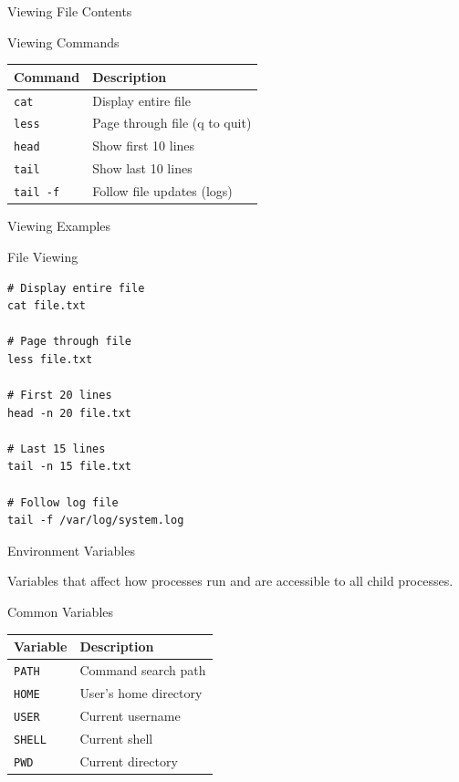 \documentclass[presentation,aspectratio=1610]{beamer}
\begin{document}
\begin{frame}[label={sec:org0a8ea09},fragile]{Viewing File Contents}
 \begin{block}{Viewing Commands}
\begin{center}
\begin{tabular}{ll}
Command & Description\\
\hline
\texttt{cat} & Display entire file\\
\texttt{less} & Page through file (q to quit)\\
\texttt{head} & Show first 10 lines\\
\texttt{tail} & Show last 10 lines\\
\texttt{tail -f} & Follow file updates (logs)\\
\end{tabular}
\end{center}
\end{block}
\end{frame}
\begin{frame}[label={sec:org446b267},fragile]{Viewing Examples}
 \begin{block}{File Viewing}
\begin{verbatim}
# Display entire file
cat file.txt

# Page through file
less file.txt

# First 20 lines
head -n 20 file.txt

# Last 15 lines
tail -n 15 file.txt

# Follow log file
tail -f /var/log/system.log
\end{verbatim}
\end{block}
\end{frame}
\begin{frame}[label={sec:orgba753ca},fragile]{Environment Variables}
 \begin{definition}\label{sec:org53a65ff}
Variables that affect how processes run and are accessible to all child processes.
\end{definition}
\begin{block}{Common Variables}
\begin{center}
\begin{tabular}{ll}
Variable & Description\\
\hline
\texttt{PATH} & Command search path\\
\texttt{HOME} & User's home directory\\
\texttt{USER} & Current username\\
\texttt{SHELL} & Current shell\\
\texttt{PWD} & Current directory\\
\end{tabular}
\end{center}
\end{block}
\end{frame}
\end{document}

